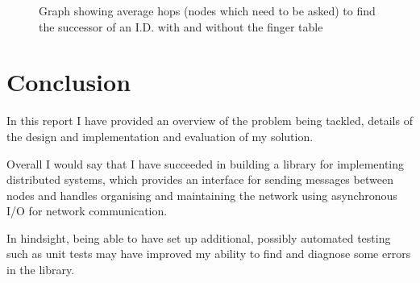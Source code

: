 \documentclass{article}
\begin{document}
\begin{figure}
\begin{center}
\end{center}
\caption{Graph showing average hops (nodes which need to be asked) to find the successor of an I.D. with and without the finger table}
\label{fig:fingerperf}
\end{figure}




\section{Conclusion}

In this report I have provided an overview of the problem being tackled, details of the design and implementation and evaluation of my solution.

Overall I would say that I have succeeded in building a library for implementing distributed systems, which provides an interface for sending messages between nodes and handles organising and maintaining the network using asynchronous I/O for network communication.

In hindsight, being able to have set up additional, possibly automated testing such as unit tests may have improved my ability to find and diagnose some errors in the library.

\end{document}
